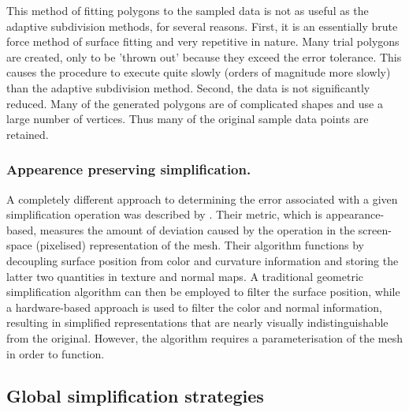 This method of fitting polygons to the sampled data is not as useful as the adaptive subdivision methods, for several reasons. First, it is an essentially brute force method of surface fitting and very repetitive in nature. Many trial polygons are created, only to be 'thrown out' because they exceed the error tolerance. This causes the procedure to execute quite slowly (orders of magnitude more slowly) than the adaptive subdivision method. Second, the data is not significantly reduced. Many of the generated polygons are of complicated shapes and use a large number of vertices. Thus many of the original sample data points are retained.


\subsubsection*{Appearence preserving simplification.}
A completely different approach to determining the error associated with a given simplification operation was described by \cite{Cohen98}. Their metric, which is appearance-based, measures the amount of deviation caused by the operation in the screen-space (pixelised) representation of the mesh. Their algorithm functions by decoupling surface position from color and curvature information and storing the latter two quantities in texture and normal maps. A traditional geometric simplification algorithm can then be employed to filter the surface position, while a hardware-based approach is used to filter the color and normal information, resulting in simplified representations that are nearly visually indistinguishable from the original. However, the algorithm requires a parameterisation of the mesh in order to function.


\subsection{Global simplification strategies}

